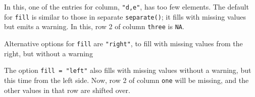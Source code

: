 \documentclass[]{book}
\newenvironment{Shaded}{\begin{snugshade}}{\end{snugshade}}
\newcommand{\CommentTok}[1]{\textcolor[rgb]{0.56,0.35,0.01}{\textit{#1}}}
\newcommand{\DataTypeTok}[1]{\textcolor[rgb]{0.13,0.29,0.53}{#1}}
\newcommand{\KeywordTok}[1]{\textcolor[rgb]{0.13,0.29,0.53}{\textbf{#1}}}
\newcommand{\NormalTok}[1]{#1}
\newcommand{\OperatorTok}[1]{\textcolor[rgb]{0.81,0.36,0.00}{\textbf{#1}}}
\newcommand{\StringTok}[1]{\textcolor[rgb]{0.31,0.60,0.02}{#1}}
\theoremstyle{plain}
\theoremstyle{remark}
\begin{document}
In this, one of the entries for column, \texttt{"d,e"}, has too few
elements. The default for \texttt{fill} is similar to those in separate
\texttt{separate()}; it fills with missing values but emits a warning.
In this, row 2 of column \texttt{three} is \texttt{NA}.

\begin{Shaded}
\end{Shaded}

Alternative options for \texttt{fill} are \texttt{"right"}, to fill with
missing values from the right, but without a warning

\begin{Shaded}
\end{Shaded}

The option \texttt{fill\ =\ "left"} also fills with missing values
without a warning, but this time from the left side. Now, row 2 of
column \texttt{one} will be missing, and the other values in that row
are shifted over.
\end{document}
